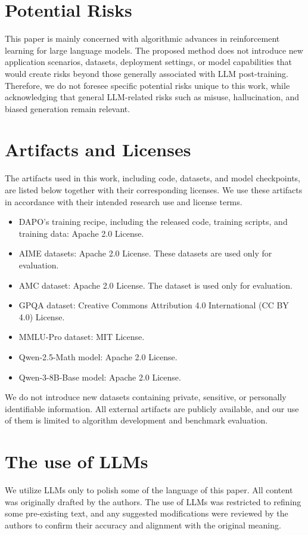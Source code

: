 \section{Potential Risks}
This paper is mainly concerned with algorithmic advances in reinforcement learning for large language models. The proposed method does not introduce new application scenarios, datasets, deployment settings, or model capabilities that would create risks beyond those generally associated with LLM post-training. Therefore, we do not foresee specific potential risks unique to this work, while acknowledging that general LLM-related risks such as misuse, hallucination, and biased generation remain relevant.


\section{Artifacts and Licenses}
The artifacts used in this work, including code, datasets, and model checkpoints, are listed below together with their corresponding licenses. We use these artifacts in accordance with their intended research use and license terms.

\begin{itemize}[left=0em,topsep=0pt,itemsep=0pt]
    \item DAPO's training recipe, including the released code, training scripts, and training data: Apache 2.0 License.
    \item AIME datasets: Apache 2.0 License. These datasets are used only for evaluation.
    \item AMC dataset: Apache 2.0 License. The dataset is used only for evaluation.
    \item GPQA dataset: Creative Commons Attribution 4.0 International (CC BY 4.0) License.
    \item MMLU-Pro dataset: MIT License.
    \item Qwen-2.5-Math model: Apache 2.0 License.
    \item Qwen-3-8B-Base model: Apache 2.0 License.
\end{itemize}

We do not introduce new datasets containing private, sensitive, or personally identifiable information. All external artifacts are publicly available, and our use of them is limited to algorithm development and benchmark evaluation.


\section{The use of LLMs}
We utilize LLMs only to polish some of the language of this paper.
All content was originally drafted by the authors. 
The use of LLMs was restricted to refining some pre-existing text, and any suggested modifications were reviewed by the authors to confirm their accuracy and alignment with the original meaning.